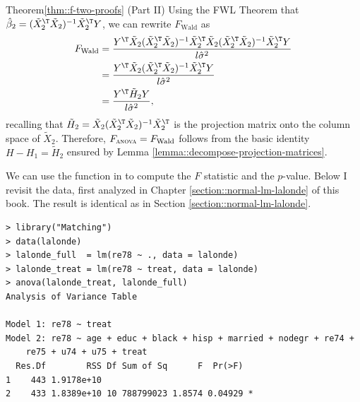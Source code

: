 \begin{myproof}{Theorem}{\ref{thm::f-two-proofs} (Part II)}
Using the FWL Theorem that $\hat{\beta}_{2}=(\tilde{X}_{2}^{\T}\tilde{X}_{2})^{-1}\tilde{X}_{2}^{\T}Y$,
we can rewrite $F_\text{Wald} $ as 
\begin{align}
F_\text{Wald} & =\frac{Y^{\T}\tilde{X}_{2}(\tilde{X}_{2}^{\T}\tilde{X}_{2})^{-1}\tilde{X}_{2}^{\T}\tilde{X}_{2}(\tilde{X}_{2}^{\T}\tilde{X}_{2})^{-1}\tilde{X}_{2}^{\T}Y}{l\hat{\sigma}^{2}}\nonumber \\
 & =\frac{Y^{\T}\tilde{X}_{2}(\tilde{X}_{2}^{\T}\tilde{X}_{2})^{-1}\tilde{X}_{2}^{\T}Y}{l\hat{\sigma}^{2}}\nonumber \\
 & =\frac{Y^{\T}\tilde{H}_{2}Y}{l\hat{\sigma}^{2}},\label{eq:Wformula}
\end{align}
recalling that  
$
\tilde{H}_{2}=\tilde{X}_{2}(\tilde{X}_{2}^{\T}\tilde{X}_{2})^{-1}\tilde{X}_{2}^{\T}
$
is the projection matrix onto the column space of $\tilde{X}_{2}.$ Therefore, $F_\textsc{anova}  = F_\text{Wald}$ follows from the basic identity $H-H_{1}=\tilde{H}_{2}$ ensured by Lemma \ref{lemma::decompose-projection-matrices}. 
\end{myproof}
 
 
We can use the  function in  to compute the $F$ statistic and the $p$-value. Below I revisit the  data, first analyzed in Chapter \ref{section::normal-lm-lalonde} of this book.  The result is identical as in Section \ref{section::normal-lm-lalonde}. 


 \begin{lstlisting}
> library("Matching")
> data(lalonde)
> lalonde_full  = lm(re78 ~ ., data = lalonde)
> lalonde_treat = lm(re78 ~ treat, data = lalonde)
> anova(lalonde_treat, lalonde_full)
Analysis of Variance Table

Model 1: re78 ~ treat
Model 2: re78 ~ age + educ + black + hisp + married + nodegr + re74 + 
    re75 + u74 + u75 + treat
  Res.Df        RSS Df Sum of Sq      F  Pr(>F)  
1    443 1.9178e+10                              
2    433 1.8389e+10 10 788799023 1.8574 0.04929 *
\end{lstlisting}


